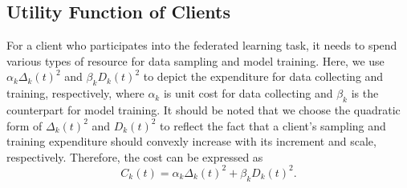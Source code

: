 \documentclass{article}
\theoremstyle{plain}
\theoremstyle{definition}
\theoremstyle{remark}
\begin{document}
\subsection{Utility Function of Clients}
For a client who participates into the federated learning task, it needs to spend various types of resource for data sampling and model training.
Here, we use $\alpha_k \Delta_k(t)^2$ and $\beta_k D_k(t)^2$ to depict the expenditure for data collecting and training, respectively, where $\alpha_k$ is unit cost for data collecting and $\beta_k$ is the counterpart for model training.
It should be noted that we choose the quadratic form of $\Delta_k(t)^2$ and $D_k(t)^2$ to reflect the fact that a client's sampling and training expenditure should convexly increase with its increment and scale, respectively.
Therefore, the cost can be expressed as
\begin{equation}
  C_k(t) = \alpha_k \Delta_k(t)^2 + \beta_k D_k(t)^2.
\end{equation}
\end{document}

